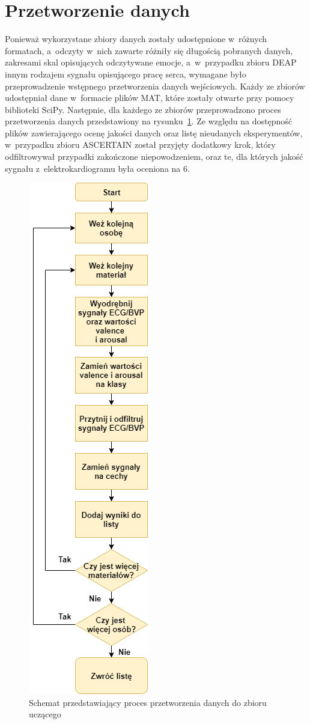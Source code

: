 \section{Przetworzenie danych}
Ponieważ wykorzystane zbiory danych zostały udostępnione w~różnych formatach, a~odczyty w~nich zawarte różniły się długością pobranych danych, zakresami skal opisujących odczytywane emocje, a~w~przypadku zbioru DEAP innym rodzajem sygnału opisującego pracę serca, wymagane było przeprowadzenie wstępnego przetworzenia danych wejściowych. Każdy ze zbiorów udostępniał dane w~formacie plików MAT, które zostały otwarte przy pomocy biblioteki SciPy. Następnie, dla każdego ze zbiorów przeprowadzono proces przetworzenia danych przedstawiony na rysunku~\ref{fig:preprocessing_flow}. Ze względu na dostępność plików zawierającego ocenę jakości danych oraz listę nieudanych eksperymentów, w~przypadku zbioru ASCERTAIN został przyjęty dodatkowy krok, który odfiltrowywał przypadki zakończone niepowodzeniem, oraz te, dla których jakość sygnału z~elektrokardiogramu była oceniona na 6.
\begin{figure}[!t]
	\centering
	\includegraphics[width=0.25\linewidth]{images/preprocessing_flow.png}
	\caption{Schemat przedstawiający proces przetworzenia danych do zbioru uczącego}
	\label{fig:preprocessing_flow}
\end{figure}

